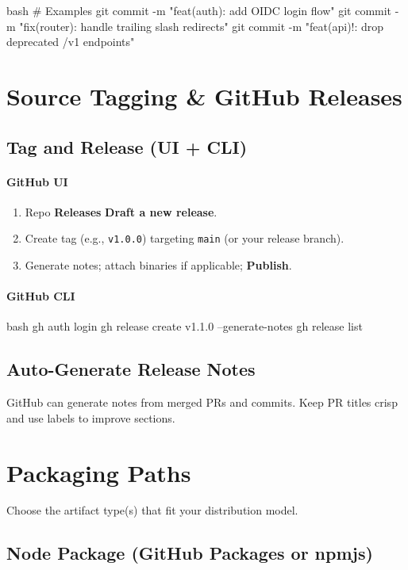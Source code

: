 \documentclass[11pt]{article}
\begin{document}
\begin{code}{bash}
# Examples
git commit -m "feat(auth): add OIDC login flow"
git commit -m "fix(router): handle trailing slash redirects"
git commit -m "feat(api)!: drop deprecated /v1 endpoints"
\end{code}
\clearpage

\section{Source Tagging \& GitHub Releases}
\subsection{Tag and Release (UI + CLI)}
\paragraph{GitHub UI}
\begin{enumerate}
  \item Repo \textrightarrow{} \textbf{Releases} \textrightarrow{} \textbf{Draft a new release}.
  \item Create tag (e.g., \texttt{v1.0.0}) targeting \texttt{main} (or your release branch).
  \item Generate notes; attach binaries if applicable; \textbf{Publish}.
\end{enumerate}

\paragraph{GitHub CLI}
\begin{code}{bash}
gh auth login
gh release create v1.1.0 --generate-notes
gh release list
\end{code}

\subsection{Auto-Generate Release Notes}
GitHub can generate notes from merged PRs and commits.
Keep PR titles crisp and use labels to improve sections.

\section{Packaging Paths}
Choose the artifact type(s) that fit your distribution model.

\subsection{Node Package (GitHub Packages or npmjs)}
\end{document}
